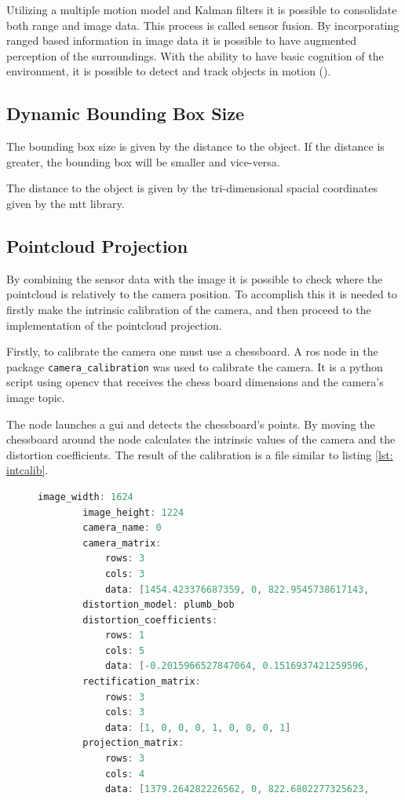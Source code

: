 Utilizing a multiple motion model and Kalman filters it is possible to consolidate both range and image data. This process is called sensor fusion. By incorporating ranged based information in image data it is possible to have augmented perception of the surroundings. With the ability to have basic cognition of the environment, it is possible to detect and track objects in motion (\cite{Spinello2010}).

\subsection{Dynamic Bounding Box Size}
The bounding box size is given by the distance to the object. If the distance is greater, the bounding box will be smaller and vice-versa.

The distance to the object is given by the tri-dimensional spacial coordinates given by the \gls{mtt} library. 

\subsection{Pointcloud Projection}

By combining the sensor data with the image it is possible to check where the pointcloud is relatively to the camera position. To accomplish this it is needed to firstly make the intrinsic calibration of the camera, and then proceed to the implementation of the pointcloud projection.

Firstly, to calibrate the camera one must use a chessboard. A \gls{ros} node in the package \texttt{camera\_calibration} was used to calibrate the camera. It is a python script using \gls{opencv} that receives the chess board dimensions and the camera's image topic.

The node launches a \gls{gui} and detects the chessboard's points. By moving the chessboard around the node calculates the intrinsic values of the camera and the distortion coefficients. The result of the calibration is a file similar to listing \ref{lst: intcalib}.

\begin{figure}
	\begin{center}
		\begin{lstlisting}[caption={Intrinsic Calibration Result}, language=c++, label={lst: intcalib}]
		image_width: 1624
		image_height: 1224
		camera_name: 0
		camera_matrix:
			rows: 3
			cols: 3
			data: [1454.423376687359, 0, 822.9545738617143, 0, 1458.005828758985, 590.5652711935882, 0, 0, 1]
		distortion_model: plumb_bob
		distortion_coefficients:
			rows: 1
			cols: 5
			data: [-0.2015966527847064, 0.1516937421259596, -0.0009340794635090795, -0.0006787308984611241, 0]
		rectification_matrix:
			rows: 3
			cols: 3
			data: [1, 0, 0, 0, 1, 0, 0, 0, 1]
		projection_matrix:
			rows: 3
			cols: 4
			data: [1379.264282226562, 0, 822.6802277325623, 0, 0, 1410.231689453125, 588.4764252277164, 0, 0, 0, 1, 0]\end{lstlisting}
	\end{center}
\end{figure}

